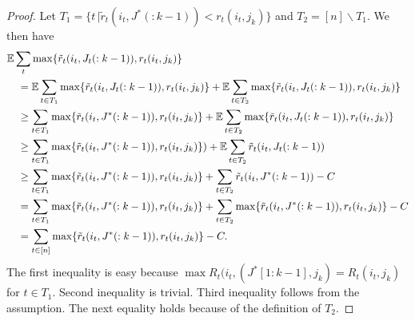 \begin{proof}
 Let $T_1 = \{ t \, | \tilde r_t(i_t,J^*(:k-1)) < r_t(i_t,j_k) \}$ and $T_2 = [n] \backslash T_1 .$ We then have 
\begin{align*}
  & \mathbb{E} \sum_t \max \{ \tilde{r}_t(i_t,J_t(:k-1)),r_t(i_t,j_k) \} \\
  & \quad = \mathbb{E}\sum_{t \in T_1} \max \{ \tilde{r}_t(i_t,J_t(:k-1)),r_t(i_t,j_k) \} + \mathbb{E}\sum_{t \in T_2} \max \{ \tilde{r}_t(i_t,J_t(:k-1)),r_t(i_t,j_k) \}  \\
  & \quad \geq \sum_{t \in T_1} \max \{ \tilde{r}_t(i_t,J^*(:k-1)),r_t(i_t,j_k) \} + \mathbb{E}\sum_{t \in T_2} \max \{ \tilde{r}_t(i_t,J_t(:k-1)),r_t(i_t,j_k) \} \\
  & \quad \geq \sum_{t \in T_1} \max \{ \tilde{r}_t(i_t,J^*(:k-1)),r_t(i_t,j_k) \}) + \mathbb{E}\sum_{t \in T_2} \tilde{r}_t(i_t,J_t(:k-1)) \\
  & \quad \geq \sum_{t \in T_1}\max \{ \tilde{r}_t(i_t,J^*(:k-1)),r_t(i_t,j_k) \} + \sum_{t \in T_2} \tilde{r}_t(i_t,J^*(:k-1)) - C \\
  & \quad = \sum_{t \in T_1} \max \{ \tilde{r}_t(i_t,J^*(:k-1)),r_t(i_t,j_k) \} + \sum_{t \in T_2} \max \{ \tilde{r}_t(i_t,J^*(:k-1)),r_t(i_t,j_k) \} - C \\
  & \quad = \sum_{t \in [n]}  \max \{ \tilde{r}_t(i_t,J^*(:k-1)),r_t(i_t,j_k) \} - C.
\end{align*}
The first inequality is easy because $\max R_t(i_t,(J^*[1:k-1],j_k) = R_t(i_t,j_k)$ for $t \in T_1$. Second inequality is trivial. Third inequality follows from the assumption. The next equality holds because of the definition of $T_2$.  
\end{proof}


